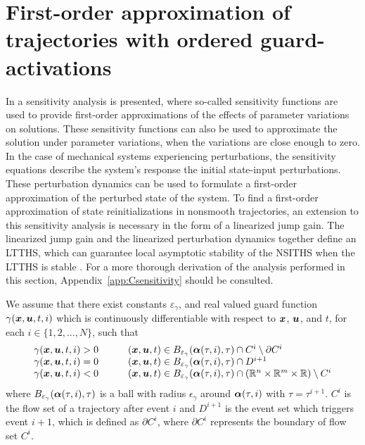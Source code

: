 \documentclass[../DC2017114Bouma.tex]{subfiles}
\begin{document}
\section{First-order approximation of trajectories with ordered guard-activations}
In \cite{Khalil1996} a sensitivity analysis is presented, where so-called sensitivity functions are used to provide first-order approximations of the effects of parameter variations on solutions. These sensitivity functions can also be used to approximate the solution under parameter variations, when the variations are close enough to zero. In the case of mechanical systems experiencing perturbations, the sensitivity equations describe the system's response the initial state-input perturbations. These perturbation dynamics can be used to formulate a first-order approximation of the perturbed state of the system. To find a first-order approximation of state reinitializations in nonsmooth trajectories, an extension to this sensitivity analysis is necessary in the form of a linearized jump gain. The linearized jump gain and the linearized perturbation dynamics together define an LTTHS, which can guarantee local asymptotic stability of the NSITHS when the LTTHS is stable \cite{Rijnen2017}. For a more thorough derivation of the analysis performed in this section, Appendix~\ref{app:Csensitivity} should be consulted.

\begin{myass}\label{ass:existence}
We assume that there exist constants $\varepsilon_\gamma$, and real valued guard function $\gamma({\boldsymbol{x}},{\boldsymbol{u}},t,i)$ which is continuously differentiable with respect to ${\boldsymbol{x}}$, ${\boldsymbol{u}}$, and $t$, for each $i\in \{1,2,...,N\}$, such that
\begin{equation}
\begin{array}{llll}
\gamma({\boldsymbol{x}},{\boldsymbol{u}},t,i) > 0 & &	&({\boldsymbol{x}},{\boldsymbol{u}},t) \in B_{\varepsilon_\gamma}(\boldsymbol{\alpha}(\tau,i),\tau)\cap C^i\setminus\partial C^i\\
\gamma({\boldsymbol{x}},{\boldsymbol{u}},t,i) = 0 & &	&({\boldsymbol{x}},{\boldsymbol{u}},t) \in B_{\varepsilon_\gamma}(\boldsymbol{\alpha}(\tau,i),\tau)\cap D^{i+1}\\
\gamma({\boldsymbol{x}},{\boldsymbol{u}},t,i) < 0 & &	&({\boldsymbol{x}},{\boldsymbol{u}},t) \in B_{\varepsilon_\gamma}(\boldsymbol{\alpha}(\tau,i),\tau)\cap (\mathbb{R}^n \times \mathbb{R}^m \times \mathbb{R})\setminus C^i
\end{array}
\end{equation}
where $B_{\varepsilon_{\gamma}}(\boldsymbol{\alpha}(\tau,i),\tau)$ is a ball with radius $\epsilon_{\gamma}$ around $\boldsymbol{\alpha}(\tau,i)$ with $\tau = \tau^{i+1}$. $C^i$ is the flow set of a trajectory after event $i$ and $D^{i+1}$ is the event set which triggers event $i+1$, which is defined as $\partial C^i$, where $\partial C^i$ represents the boundary of flow set $C^i$.
\end{myass}
\end{document}
